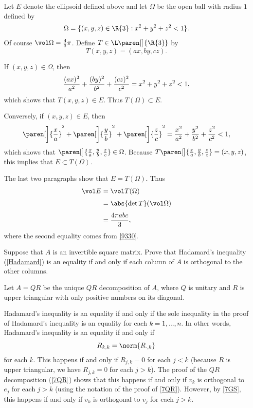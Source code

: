 \begin{Solution}
Let $E$ denote the ellipsoid defined above and let $\Omega$ be the open ball with radius
$1$ defined by
\[
\Omega = \{(x, y, z) \in \R{3}: x^2 + y^2 + z^2 < 1 \}.
\]
Of course $\vol \Omega = \frac{4}{3}\pi$.  Define $T \in \L\paren[\big]{\R{3}}$ by
\[
T(x, y, z) = (ax, by, cz).
\]

If $(x, y, z) \in \Omega$, then
\[
\frac{(ax)^2}{a^2} + \frac{(by)^2}{b^2} + \frac{(cz)^2}{c^2}
= x^2 + y^2 + z^2 \\[3bp]
< 1,
\]
which shows that $T(x, y, z) \in E$.  Thus $T(\Omega) \subset E$.

Conversely, if $(x, y, z) \in E$, then
\[
\paren[\bigg]{\frac{x}{a}}^2 + \paren[\bigg]{\frac{y}{b}}^2 +
\paren[\bigg]{\frac{z}{c }}^2
=  \frac{x^2}{a^2} + \frac{y^2}{b^2} + \frac{z^2}{c^2} \\[3bp]
 < 1,
\]
which shows that $\paren[\big]{\frac{x}{a}, \frac{y}{b}, \frac{z}{c}} \in \Omega$.  Because
$T\paren[\big]{\frac{x}{a}, \frac{y}{b}, \frac{z}{c}} = (x, y, z)$, this implies that
$E \subset T(\Omega)$.

The last two paragraphs show that $E = T(\Omega)$.  Thus
\begin{align*}
\vol E &= \vol T(\Omega) \\[3bp]
&= \abs{\det T} (\vol \Omega) \\[3bp]
&= \frac{4\pi abc}{3},
\end{align*}
where the second equality comes from \ref{9330}.
\end{Solution}

\exercise
Suppose that $A$ is an invertible square matrix. Prove that Hadamard's \mbox{inequality} (\ref{Hadamard}) is an equality if and only if each column of $A$ is orthogonal to the other columns.\label{7HadEq}

\begin{Solution}
Let $A = QR$ be the unique $QR$ decomposition of $A$, where $Q$ is unitary and $R$ is upper triangular with only positive numbers on its diagonal.

Hadamard's inequality is an equality if and only if the sole inequality in the proof of Hadamard's inequality is an equality for each
$k = 1, \ldots, n$. In other words, Hadamard's inequality is an equality if and only if
\[
R_{k,k} = \norm{ R_{\cdot, k} }
\]
for each $k$. This happens if and only if $R_{j,k} = 0$ for each $j < k$ (because $R$ is upper triangular, we have $R_{j,k} = 0$ for each
$j > k$). The proof of the $QR$ decomposition (\ref{7QR}) shows that this happens if and only if $v_k$ is orthogonal to $e_j$ for each
$j > k$ (using the notation of the proof of \ref{7QR}). However, by \ref{7GS}, this happens if and only if $v_k$ is orthogonal to $v_j$ for each
$j > k$.
\end{Solution}

